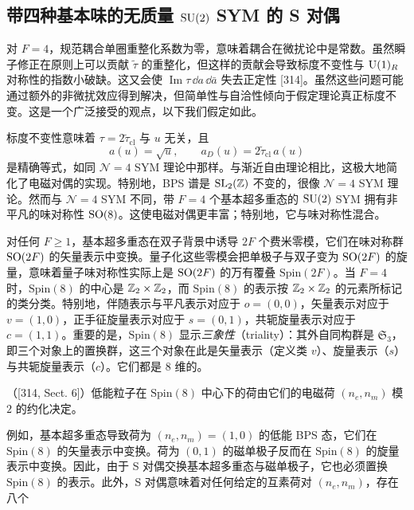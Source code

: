 
\subsection{带四种基本味的无质量 $\operatorname{SU}(2)$ SYM 的 S 对偶}

对 $F=4$，规范耦合单圈重整化系数为零，意味着耦合在微扰论中是常数。虽然瞬子修正在原则上可以贡献 $\tilde\tau$ 的重整化，但这样的贡献会导致标度不变性与 $\operatorname{U}(1)_R$ 对称性的指数小破缺。这又会使 $\operatorname{Im}\tau\,\dd a\,\dd\bar a$ 失去正定性 [314]。虽然这些问题可能通过额外的非微扰效应得到解决，但简单性与自洽性倾向于假定理论真正标度不变。这是一个广泛接受的观点，以下我们假定如此。

\begin{remark}[20.25]
标度不变性意味着 $\tau=2\tilde\tau_{\mathrm{cl}}$ 与 $u$ 无关，且
\[
a(u)=\sqrt u,\qquad a_D(u)=2\tilde\tau_{\mathrm{cl}}\,a(u)
\]
是精确等式，如同 $\mathcal{N}=4$ SYM 理论中那样。与渐近自由理论相比，这极大地简化了电磁对偶的实现。特别地，BPS 谱是 $\operatorname{SL}_2(\mathbb{Z})$ 不变的，很像 $\mathcal{N}=4$ SYM 理论。然而与 $\mathcal{N}=4$ SYM 不同，带 $F=4$ 个基本超多重态的 $\operatorname{SU}(2)$ SYM 拥有非平凡的味对称性 $\operatorname{SO}(8)$。这使电磁对偶更丰富；特别地，它与味对称性混合。
\end{remark}

对任何 $F\ge1$，基本超多重态在双子背景中诱导 $2F$ 个费米零模，它们在味对称群 $\operatorname{SO}(2F)$ 的矢量表示中变换。量子化这些零模会把单极子与双子变为 $\operatorname{SO}(2F)$ 的旋量，意味着量子味对称性实际上是 $\operatorname{SO}(2F)$ 的万有覆叠 $\mathrm{Spin}(2F)$。当 $F=4$ 时，$\mathrm{Spin}(8)$ 的中心是 $\mathbb{Z}_2\times\mathbb{Z}_2$，而 $\mathrm{Spin}(8)$ 的表示按 $\mathbb{Z}_2\times\mathbb{Z}_2$ 的元素所标记的类分类。特别地，伴随表示与平凡表示对应于 $o=(0,0)$，矢量表示对应于 $v=(1,0)$，正手征旋量表示对应于 $s=(0,1)$，共轭旋量表示对应于 $c=(1,1)$。重要的是，$\mathrm{Spin}(8)$ 显示\emph{三象性}（triality）：其外自同构群是 $\mathfrak{S}_3$，即三个对象上的置换群，这三个对象在此是矢量表示（定义类 $v$）、旋量表示（$s$）与共轭旋量表示（$c$）。它们都是 $8$ 维的。

\begin{proposition}[20.26]
（[314, Sect. 6]）低能粒子在 $\mathrm{Spin}(8)$ 中心下的荷由它们的电磁荷 $(n_e,n_m)$ 模 $2$ 的约化决定。
\end{proposition}

例如，基本超多重态导致荷为 $(n_e,n_m)=(1,0)$ 的低能 BPS 态，它们在 $\mathrm{Spin}(8)$ 的矢量表示中变换。荷为 $(0,1)$ 的磁单极子反而在 $\mathrm{Spin}(8)$ 的旋量表示中变换。因此，由于 S 对偶交换基本超多重态与磁单极子，它也必须置换 $\mathrm{Spin}(8)$ 的表示。此外，S 对偶意味着对任何给定的互素荷对 $(n_e,n_m)$，存在八个
